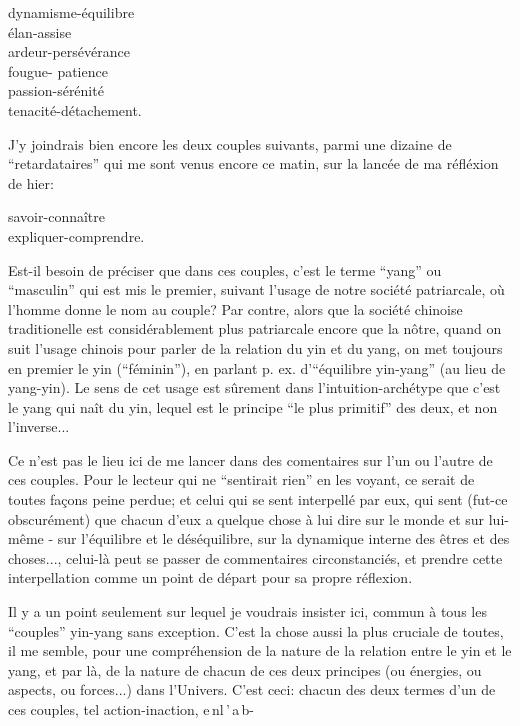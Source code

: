 
\begin{flushleft}
dynamisme-équilibre\\
élan-assise\\
ardeur-persévérance\\
fougue- patience\\
passion-sérénité\\
tenacité-détachement.
\end{flushleft}

J'y joindrais bien encore les deux couples suivants, parmi une dizaine de ``retardataires'' qui me sont venus encore ce matin, sur la lancée de ma réfléxion de hier:

\begin{flushleft}
savoir-connaître\\
expliquer-comprendre.
\end{flushleft}

Est-il besoin de préciser que dans ces couples, c'est le terme ``yang'' ou ``masculin'' qui est mis le premier, suivant l'usage de notre société patriarcale, où l'homme donne le nom au couple? Par contre, alors que la société chinoise traditionelle est considérablement plus patriarcale encore que la nôtre, quand on suit l'usage chinois pour parler de la relation du yin et du yang, on met toujours en premier le yin (``féminin''), en parlant p. ex. d'``équilibre yin-yang'' (au lieu de yang-yin). Le sens de cet usage est sûrement dans l'intuition-archétype que c'est le yang qui naît du yin, lequel est le principe ``le plus primitif'' des deux, et non l'inverse...

Ce n'est pas le lieu ici de me lancer dans des comentaires sur l'un ou l'autre de ces couples. Pour le lecteur qui ne ``sentirait rien'' en les voyant, ce serait de toutes façons peine perdue; et celui qui se sent interpellé par eux, qui sent (fut-ce obscurément) que chacun d'eux a quelque chose à lui dire sur le monde et sur lui-même - sur l'équilibre et le déséquilibre, sur la dynamique interne des êtres et des choses..., celui-là peut se passer de commentaires circonstanciés, et prendre cette interpellation comme un point de départ pour sa propre réflexion.

 Il y a un point seulement sur lequel je voudrais insister ici, commun à tous les ``couples'' yin-yang sans exception. C'est la chose aussi la plus cruciale de toutes, il me semble, pour une compréhension de la nature de la relation entre le yin et le yang, et par là, de la nature de chacun de ces deux principes (ou énergies, ou aspects, ou forces...) dans l'Univers. C'est ceci: chacun des deux termes d'un de ces couples, tel action-inaction, e\,n\quad l\,'\,a\,b-
\margin{\unsure{-}}
